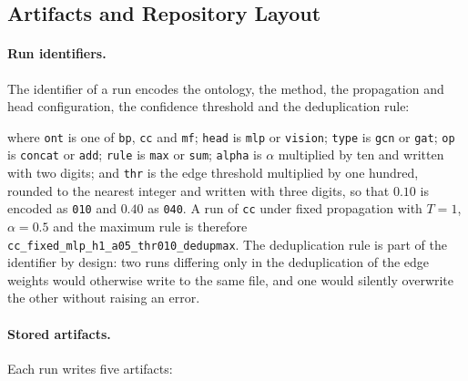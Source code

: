 \documentclass[Ingles]{ic-tese-v3}
\begin{document}
\begin{appendices}{}
\section{Artifacts and Repository Layout}
\label{ape:artefatos}

\paragraph{Run identifiers.} The identifier of a run encodes the ontology, the method, the
propagation and head configuration, the confidence threshold and the deduplication rule:

\begin{center}
\end{center}

\noindent where \texttt{ont} is one of \texttt{bp}, \texttt{cc} and \texttt{mf}; \texttt{head} is
\texttt{mlp} or \texttt{vision}; \texttt{type} is \texttt{gcn} or \texttt{gat}; \texttt{op} is
\texttt{concat} or \texttt{add}; \texttt{rule} is \texttt{max} or \texttt{sum}; \texttt{alpha} is
$\alpha$ multiplied by ten and written with two digits; and \texttt{thr} is the edge threshold
multiplied by one hundred, rounded to the nearest integer and written with three digits, so that
$0.10$ is encoded as \texttt{010} and $0.40$ as \texttt{040}. A run of \texttt{cc} under fixed
propagation with $T = 1$, $\alpha = 0.5$ and the maximum rule is therefore
\texttt{cc\_fixed\_mlp\_h1\_a05\_thr010\_dedupmax}. The deduplication rule is part of the identifier
by design: two runs differing only in the deduplication of the edge weights would otherwise write to
the same file, and one would silently overwrite the other without raising an error.

\paragraph{Stored artifacts.} Each run writes five artifacts:


\end{appendices}
\end{document}
